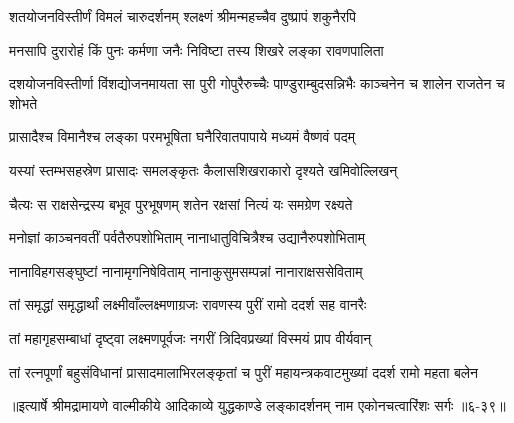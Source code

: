 \twolineshloka
{शतयोजनविस्तीर्णं विमलं चारुदर्शनम्}
{श्लक्ष्णं श्रीमन्महच्चैव दुष्प्रापं शकुनैरपि} %

\twolineshloka
{मनसापि दुरारोहं किं पुनः कर्मणा जनैः}
{निविष्टा तस्य शिखरे लङ्का रावणपालिता} %

\threelineshloka
{दशयोजनविस्तीर्णा विंशद्योजनमायता}
{सा पुरी गोपुरैरुच्चैः पाण्डुराम्बुदसन्निभैः}
{काञ्चनेन च शालेन राजतेन च शोभते} %

\twolineshloka
{प्रासादैश्च विमानैश्च लङ्का परमभूषिता}
{घनैरिवातपापाये मध्यमं वैष्णवं पदम्} %

\twolineshloka
{यस्यां स्तम्भसहस्रेण प्रासादः समलङ्कृतः}
{कैलासशिखराकारो दृश्यते खमिवोल्लिखन्} %

\twolineshloka
{चैत्यः स राक्षसेन्द्रस्य बभूव पुरभूषणम्}
{शतेन रक्षसां नित्यं यः समग्रेण रक्ष्यते} %

\twolineshloka
{मनोज्ञां काञ्चनवतीं पर्वतैरुपशोभिताम्}
{नानाधातुविचित्रैश्च उद्यानैरुपशोभिताम्} %

\twolineshloka
{नानाविहगसङ्घुष्टां नानामृगनिषेविताम्}
{नानाकुसुमसम्पन्नां नानाराक्षससेविताम्} %

\twolineshloka
{तां समृद्धां समृद्धार्थां लक्ष्मीवाँल्लक्ष्मणाग्रजः}
{रावणस्य पुरीं रामो ददर्श सह वानरैः} %

\twolineshloka
{तां महागृहसम्बाधां दृष्ट्वा लक्ष्मणपूर्वजः}
{नगरीं त्रिदिवप्रख्यां विस्मयं प्राप वीर्यवान्} %

\twolineshloka
{तां रत्नपूर्णां बहुसंविधानां प्रासादमालाभिरलङ्कृतां च}
{पुरीं महायन्त्रकवाटमुख्यां ददर्श रामो महता बलेन} %


॥इत्यार्षे श्रीमद्रामायणे वाल्मीकीये आदिकाव्ये युद्धकाण्डे लङ्कादर्शनम् नाम एकोनचत्वारिंशः सर्गः ॥६-३९॥
